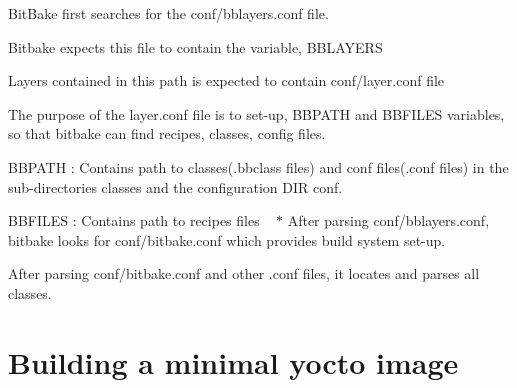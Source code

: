 \begin{DoxyItemize}
\item Bit\+Bake first searches for the conf/bblayers.\+conf file.
\item Bitbake expects this file to contain the variable, B\+B\+L\+A\+Y\+E\+RS
\item Layers contained in this path is expected to contain conf/layer.\+conf file
\item The purpose of the layer.\+conf file is to set-\/up, B\+B\+P\+A\+TH and B\+B\+F\+I\+L\+ES variables, so that bitbake can find recipes, classes, config files.
\item B\+B\+P\+A\+TH \+: Contains path to classes(.bbclass files) and conf files(.conf files) in the sub-\/directories classes and the configuration D\+IR conf.
\item B\+B\+F\+I\+L\+ES \+: Contains path to recipes files ~\newline
$\ast$ After parsing conf/bblayers.\+conf, bitbake looks for conf/bitbake.\+conf which provides build system set-\/up.
\item After parsing conf/bitbake.\+conf and other .conf files, it locates and parses all classes. 
\end{DoxyItemize}\hypertarget{asrbuild_introduction}{}\section{Building a minimal yocto image}\label{asrbuild_introduction}

